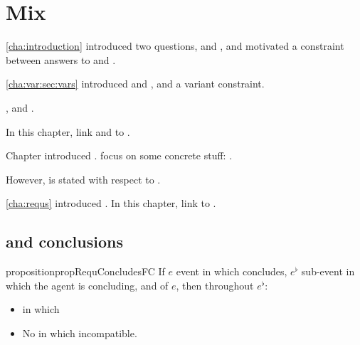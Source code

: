 \chapter{Mix}
\label{cha:binding}

\begin{note}
  \autoref{cha:introduction} introduced two questions, \qWhy{} and \qHow{}, and motivated a constraint between answers to \qWhy{} and \qHow{}.

  \autoref{cha:var:sec:vars} introduced \qWhyV{} and \qHowV{}, and a variant constraint.

  \fc{}, and \requ{}.

  In this chapter, link  and  to \qWhyV{}.
\end{note}

\begin{note}
  Chapter introduced .
   focus on some concrete stuff: .

  However, \qWhyV{} is stated with respect to \ros{}.
\end{note}


\begin{note}
  \autoref{cha:requs} introduced .
  In this chapter, link  to \qWhyV{}.
\end{note}

\section{ and conclusions}
\label{sec:requ3-conclusions}

\begin{note}
  \begin{restatable}{proposition}{propRequConcludesFC}
    If \(e\) event in which \vAgent{} concludes, \(e^{\flat}\) sub-event in which the agent is concluding, and \requ{} of \(e\), then throughout \(e^{\flat}\):
    \begin{itemize}
    \item
      \pevent{} in which \vAgent{}
    \item
      No \pevent{} in which incompatible.
    \end{itemize}
  \end{restatable}
\end{note}

